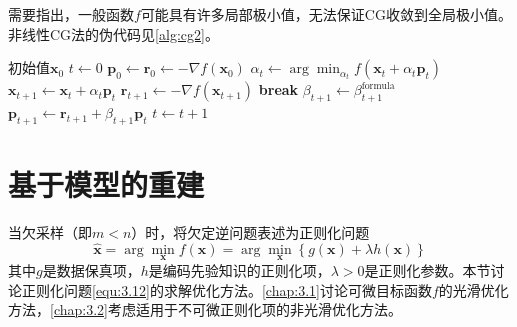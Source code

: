 \documentclass[12pt]{article}
\begin{document}
需要指出，一般函数$f$可能具有许多局部极小值，无法保证CG收敛到全局极小值。非线性CG法的伪代码见\autoref{alg:cg2}。
\begin{algorithm}[ht]
    \small
    \caption{极小化连续函数$f(\bm{x})$的非线性共轭梯度法}
    \label{alg:cg2}
    \begin{algorithmic}[1]
        \Require 初始值$\bm{x}_0$
        \State $t\gets0$
        \State $\bm{p}_0\gets\bm{r}_0\gets-\nabla f(\bm{x}_0)$
        \Repeat
            \State $\alpha_t\gets\arg\min_{\alpha_t} f(\bm{x}_t+\alpha_t\bm{p}_t)$ 
            \State $\bm{x}_{t+1}\gets\bm{x}_t+\alpha_t\bm{p}_t$
            \State $\bm{r}_{t+1}\gets-\nabla f(\bm{x}_{t+1})$ 
                \State \textbf{break}
            \EndIf
            \State $\beta_{t+1}\gets\beta_{t+1}^\mathrm{formula}$ 
            \State $\bm{p}_{t+1}\gets\bm{r}_{t+1}+\beta_{t+1}\bm{p}_t$
            \State $t\gets t+1$
    \end{algorithmic}
\end{algorithm}

\section{基于模型的重建}
当欠采样（即$m<n$）时，将欠定逆问题表述为正则化问题
\begin{equation}
    \hat{\bm{x}}=\arg\min_{\bm{x}}f(\bm{x})=\arg\min_{\bm{x}}\left\{g(\bm{x})+\lambda h(\bm{x})\right\}
    \label{equ:3.12}
\end{equation}
其中$g$是数据保真项，$h$是编码先验知识的正则化项，$\lambda>0$是正则化参数。本节讨论正则化问题\autoref{equ:3.12}的求解优化方法。\autoref{chap:3.1}讨论可微目标函数$f$的光滑优化方法，\autoref{chap:3.2}考虑适用于不可微正则化项的非光滑优化方法。
\end{document}
